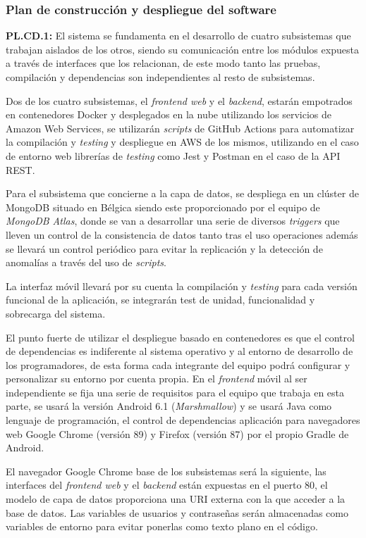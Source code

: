 \documentclass{article}
\begin{document}
\pagebreak
\subsubsection{Plan de construcción y despliegue del software}

\textbf{PL.CD.1: }
El sistema se fundamenta en el desarrollo de cuatro subsistemas que trabajan aislados de los otros, siendo su comunicación entre los módulos expuesta a través de interfaces que los relacionan, de este modo tanto las pruebas, compilación y dependencias son independientes al resto de subsistemas. 
 
Dos de los cuatro subsistemas, el \textit{frontend web} y el \textit{backend}, estarán empotrados en contenedores Docker y desplegados en la nube utilizando los servicios de Amazon Web Services, se utilizarán \textit{scripts} de GitHub Actions para automatizar la compilación y \textit{testing} y despliegue en AWS de los mismos, utilizando en el caso de entorno web librerías de \textit{testing} como Jest y Postman en el caso de la API REST. 

Para el subsistema que concierne a la capa de datos, se despliega en un clúster de MongoDB situado en Bélgica siendo este proporcionado por el equipo de \textit{MongoDB Atlas}, donde se van a desarrollar una serie de diversos \textit{triggers} que lleven un control de la consistencia de datos tanto tras el uso operaciones además se llevará un control periódico para evitar la replicación y la detección de anomalías a través del uso de \textit{scripts}.

La interfaz móvil llevará por su cuenta la compilación y \textit{testing} para cada versión funcional de la aplicación, se integrarán test de unidad, funcionalidad y sobrecarga del sistema.

El punto fuerte de utilizar el despliegue basado en contenedores es que el control de dependencias es indiferente al sistema operativo y al entorno de desarrollo de los programadores, de esta forma cada integrante del equipo podrá configurar y personalizar su entorno por cuenta propia. En el \textit{frontend} móvil al ser independiente se fija una serie de requisitos para el equipo que trabaja en esta parte, se usará la versión Android 6.1 (\textit{Marshmallow}) y se usará Java como lenguaje de programación, el control de dependencias aplicación para navegadores web Google Chrome (versión 89) y Firefox (versión 87) por el propio Gradle de Android.

El navegador Google Chrome  base de los subsistemas será la siguiente, las interfaces del \textit{frontend web} y el \textit{backend} están expuestas en el puerto 80, el modelo de capa de datos proporciona una URI externa con la que acceder a la base de datos. Las variables de usuarios y contraseñas serán almacenadas como variables de entorno para evitar ponerlas como texto plano en el código.
\end{document}
